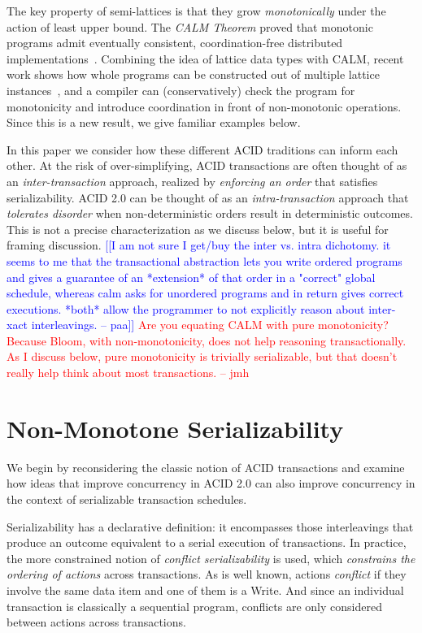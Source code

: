 \documentclass{sig-alternate}
\newcommand{\jmh}[1]{{\textcolor{red}{#1 -- jmh}}}
\newcommand{\paa}[1]{{\textcolor{blue}{[[#1 -- paa]]}}}
\begin{document}
The key property of semi-lattices is that they grow \emph{monotonically} under
the action of least upper bound.  The \emph{CALM Theorem} proved that monotonic
programs admit eventually consistent, coordination-free distributed
implementations~\cite{Alvaro2011,Ameloot2011,Hellerstein2010}.  Combining the
idea of lattice data types with CALM, recent work shows how whole programs can
be constructed out of multiple lattice instances~\cite{Conway2012}, and a
compiler can (conservatively) check the program for monotonicity and introduce
coordination in front of non-monotonic operations.  Since this is a new result,
we give familiar examples below.

In this paper we consider how these different ACID traditions can inform each
other.  At the risk of over-simplifying, ACID transactions are often thought of
as an \emph{inter-transaction} approach, realized by \emph{enforcing an order}
that satisfies serializability.  ACID 2.0 can be thought of as an
\emph{intra-transaction} approach that \emph{tolerates disorder} when
non-deterministic orders result in deterministic outcomes.  This is not a
precise characterization as we discuss below, but it is useful for framing
discussion.  \paa{I am not sure I get/buy the inter vs. intra dichotomy.  it
  seems to me that the transactional abstraction lets you write ordered programs
  and gives a guarantee of an *extension* of that order in a "correct" global
  schedule, whereas calm asks for unordered programs and in return gives correct
  executions.  *both* allow the programmer to not explicitly reason about
  inter-xact interleavings.} \jmh{Are you equating CALM with pure monotonicity?  
  Because Bloom, with non-monotonicity, does not help reasoning transactionally.
  As I discuss below, pure monotonicity is trivially serializable, but that doesn't
  really help think about most transactions.}

\section{Non-Monotone Serializability}
We begin by reconsidering the classic notion of ACID transactions and examine
how ideas that improve concurrency in ACID 2.0 can also improve concurrency in
the context of serializable transaction schedules.

Serializability has a declarative definition: it encompasses those interleavings
that produce an outcome equivalent to a serial execution of transactions.  In
practice, the more constrained notion of \emph{conflict serializability} is
used, which \emph{constrains the ordering of actions} across transactions.  As
is well known, actions \emph{conflict} if they involve the same data item and
one of them is a Write.  And since an individual transaction is classically a
sequential program, conflicts are only considered between actions across
transactions.
\end{document}
